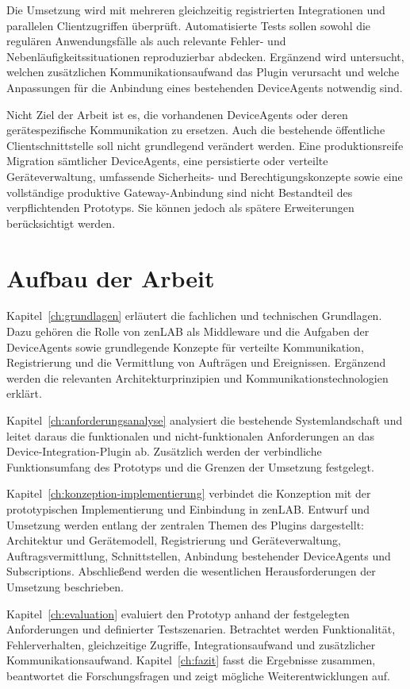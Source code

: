 Die Umsetzung wird mit mehreren gleichzeitig registrierten Integrationen und parallelen Clientzugriffen überprüft. Automatisierte Tests sollen sowohl die regulären Anwendungsfälle als auch relevante Fehler- und Nebenläufigkeitssituationen reproduzierbar abdecken. Ergänzend wird untersucht, welchen zusätzlichen Kommunikationsaufwand das Plugin verursacht und welche Anpassungen für die Anbindung eines bestehenden DeviceAgents notwendig sind.

Nicht Ziel der Arbeit ist es, die vorhandenen DeviceAgents oder deren gerätespezifische Kommunikation zu ersetzen. Auch die bestehende öffentliche Clientschnittstelle soll nicht grundlegend verändert werden. Eine produktionsreife Migration sämtlicher DeviceAgents, eine persistierte oder verteilte Geräteverwaltung, umfassende Sicherheits- und Berechtigungskonzepte sowie eine vollständige produktive Gateway-Anbindung sind nicht Bestandteil des verpflichtenden Prototyps. Sie können jedoch als spätere Erweiterungen berücksichtigt werden.

\section{Aufbau der Arbeit}

Kapitel~\ref{ch:grundlagen} erläutert die fachlichen und technischen Grundlagen. Dazu gehören die Rolle von zenLAB als Middleware und die Aufgaben der DeviceAgents sowie grundlegende Konzepte für verteilte Kommunikation, Registrierung und die Vermittlung von Aufträgen und Ereignissen. Ergänzend werden die relevanten Architekturprinzipien und Kommunikationstechnologien erklärt.

Kapitel~\ref{ch:anforderungsanalyse} analysiert die bestehende Systemlandschaft und leitet daraus die funktionalen und nicht-funktionalen Anforderungen an das Device-Integration-Plugin ab. Zusätzlich werden der verbindliche Funktionsumfang des Prototyps und die Grenzen der Umsetzung festgelegt.

Kapitel~\ref{ch:konzeption-implementierung} verbindet die Konzeption mit der prototypischen Implementierung und Einbindung in zenLAB. Entwurf und Umsetzung werden entlang der zentralen Themen des Plugins dargestellt: Architektur und Gerätemodell, Registrierung und Geräteverwaltung, Auftragsvermittlung, Schnittstellen, Anbindung bestehender DeviceAgents und Subscriptions. Abschließend werden die wesentlichen Herausforderungen der Umsetzung beschrieben.

Kapitel~\ref{ch:evaluation} evaluiert den Prototyp anhand der festgelegten Anforderungen und definierter Testszenarien. Betrachtet werden Funktionalität, Fehlerverhalten, gleichzeitige Zugriffe, Integrationsaufwand und zusätzlicher Kommunikationsaufwand. Kapitel~\ref{ch:fazit} fasst die Ergebnisse zusammen, beantwortet die Forschungsfragen und zeigt mögliche Weiterentwicklungen auf.
